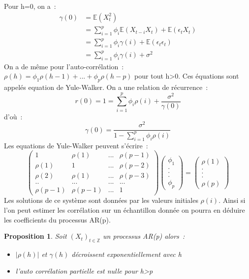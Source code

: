 \documentclass[11pt]{scrartcl} %
\newtheorem{pro}[theorem]{Proposition}
\newcommand{\Xt}{\left(X_t\right)_{t\in\mathbb{Z}}}
\begin{document}
Pour h=0, on a~:
\begin{align*}
\gamma(0)&= \mathbb{E}\left(X_t^2\right)\\
&= \sum_{i=1}^p\phi_i\mathbb{E}\left(X_{t-i}X_{t}\right)+\mathbb{E}\left(\epsilon_tX_{t}\right)\\
&= \sum_{i=1}^p\phi_i\gamma(i)+\mathbb{E}\left(\epsilon_t\epsilon_{t}\right)\\
&=\sum_{i=1}^p\phi_i\gamma(i)+\sigma^2
\end{align*}
On a de même pour l'auto-corrélation~:~$\rho(h)=\phi_1\rho(h-1)+...+\phi_p\rho(h-p)$ pour tout h>0.
Ces équations sont appelés equation de Yule-Walker. 
On a une relation de récurrence~:
$$
r(0)=1=\sum_{i=1}^p\phi_i\rho(i)+\frac{\sigma^2}{\gamma(0)}
$$
d'où~:
$$
\gamma(0)=\frac{\sigma^2}{1-\sum_{i=1}^p\phi_i\rho(i)}
$$
Les equations de Yule-Walker peuvent s'écrire~:
$$
\left(
\begin{array}{cccc}
1 & \rho(1) & ... & \rho(p-1)\\
\rho(1) & 1 & ... &  \rho(p-2)\\
\rho(2) & \rho(1) & ... & \rho(p-3)\\
.. & ... & ... & ...\\
\rho(p-1) & \rho(p-1) & ... & 1
\end{array}
\right)
\left(
\begin{array}{c}
\phi_1\\
. \\
. \\
.\\
\phi_p
\end{array}
\right)=\left(
\begin{array}{c}
\rho(1)\\
. \\
. \\
.\\
\rho(p)
\end{array}
\right)
$$
Les solutions de ce système sont données par les valeurs initiales $\rho(i)$. Ainsi si l'on peut estimer les corrélation sur un échantillon donnée on pourra en déduire les coefficients du processus AR(p).
\begin{pro}
Soit $\Xt$ un processus AR(p) alors~:
\begin{itemize}
\item[i)] $|\rho(h)|$ et $\gamma(h)$ décroissent exponentiellement avec h\\
\item[ii)] l'auto corrélation partielle est nulle pour h>p
\end{itemize}
\end{pro}
\end{document}
